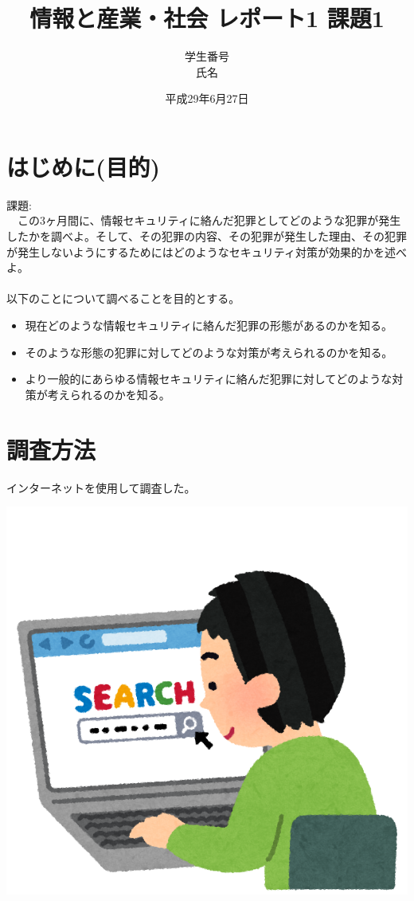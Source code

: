 \documentclass[a4paper,12pt]{jarticle}
\title{情報と産業・社会 レポート1 課題1}
\author{学生番号\\氏名}
\date{平成29年6月27日}
\begin{document}
\maketitle
\tableofcontents
\section{はじめに(目的)}
課題:\\
　この3ヶ月間に、情報セキュリティに絡んだ犯罪としてどのような犯罪が発生したかを調べよ。そして、その犯罪の内容、その犯罪が発生した理由、その犯罪が発生しないようにするためにはどのようなセキュリティ対策が効果的かを述べよ。\\
\\
以下のことについて調べることを目的とする。
\begin{itemize}
 \item 現在どのような情報セキュリティに絡んだ犯罪の形態があるのかを知る。
 \item そのような形態の犯罪に対してどのような対策が考えられるのかを知る。
 \item より一般的にあらゆる情報セキュリティに絡んだ犯罪に対してどのような対策が考えられるのかを知る。
\end{itemize}
\newpage
\section{調査方法}
インターネットを使用して調査した。
\begin{center}
\includegraphics[width=100truemm]{computer_search_kensaku.png}
\end{center}
\end{document}
